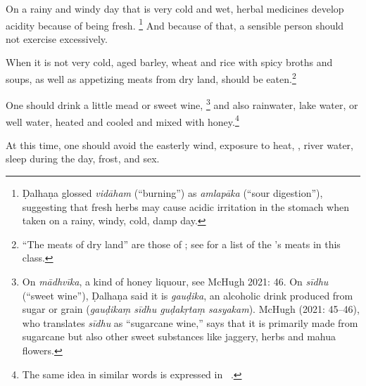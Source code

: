 \begin{translation}
\item [8cd--9]
On a rainy and windy day that is very cold and wet, %
herbal medicines develop acidity because of being fresh.%
	\footnote{Ḍalhaṇa \citep[809]{vulgate}  glossed \emph{vidāham} (“burning”) as \emph{amlapāka} (“sour digestion”), suggesting that fresh herbs may cause acidic irritation in the stomach when taken on a rainy, windy, cold, damp day.}
And because of that, a sensible person should not exercise excessively.

\item [10] %
When it is not very cold, aged barley, wheat and rice with spicy broths and soups, as well as appetizing meats from dry land, 
should be eaten.\footnote{``The meats of dry land'' are those of ; see \cite[fig.\,5, p.\,52]{zimm-1999} for a list of the \SS's meats in this class.\label{jaṅgala}} 

\item [11] %
One should drink a little mead or sweet wine,%
	\footnote{On \emph{mādhvīka}, a kind of honey liquour, see McHugh 2021: 46. On \emph{sīdhu} (“sweet wine”), Ḍalhaṇa \citep[778]{vulgate} said it is \emph{gauḍika}, an alcoholic drink produced from sugar or grain (\emph{gauḍikaṃ sīdhu guḍakṛtaṃ sasyakam}). McHugh (2021: 45–46), who translates \emph{sīdhu} as “sugarcane wine,” says that it is primarily made from sugarcane but also other sweet substances like jaggery, herbs and mahua flowers.}
%
and also rainwater, lake water, or well water, heated and cooled and mixed with honey.\footnote{The same idea in similar words is expressed in \CS\ .} 

\item[12] %
At this time, %
one should avoid the easterly wind, exposure to  heat, , river water, sleep during the day, frost, and sex.


\end{translation}
